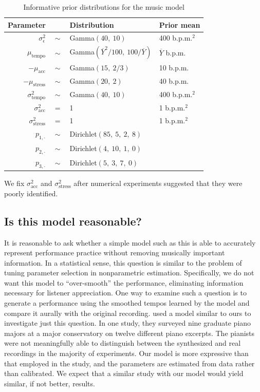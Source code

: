 \documentclass[aoas]{imsart}
\begin{document}
\begin{table}[t]
    \caption{Informative prior distributions for the music model}
  \label{tab:priors}
  \centering
  \begin{tabular}{@{}rcll@{}}
    \toprule
    Parameter & \phantom{a} & Distribution & Prior mean\\
    \midrule
    $\sigma^2_{\epsilon}$ & $\sim$ & Gamma$(40,\ 10)$ & 400 b.p.m.$^2$\\
    $\mu_{\textrm{tempo}}$ & $\sim$ & Gamma$(\overline{Y}^2/100,\ 100
                                      /\overline{Y})$ & $\overline{Y}$
                                                        b.p.m.\\
    $-\mu_{\textrm{acc}} $ & $\sim$ & Gamma$(15,\ 2/3)$ & 10 b.p.m.\\
    $-\mu_{\textrm{stress}} $ & $\sim$ & Gamma$(20,\ 2)$ & 40 b.p.m.\\
    $\sigma^2_{\textrm{tempo}} $ & $\sim$ & Gamma$(40,\ 10)$ & 400
                                                               b.p.m.$^2$\\
    $\sigma^2_{\textrm{acc}} $ & $=$ & 1 & 1 b.p.m.$^2$\\
    $\sigma^2_{\textrm{stress}} $ & $=$ & 1 & 1 b.p.m.$^2$\\
    $p_{1,\cdot}$ & $\sim$ & Dirichlet$(85,\ 5,\ 2,\ 8)$ \\
    $p_{2,\cdot}$ & $\sim$ & Dirichlet$(4,\ 10,\ 1,\ 0)$ \\
    $p_{3,\cdot}$ & $\sim$ & Dirichlet$(5,\ 3,\ 7,\ 0)$ \\
    \bottomrule
  \end{tabular}
\end{table}
We fix $\sigma^2_{\textrm{acc}}$ and $\sigma^2_{\textrm{stress}}$ after numerical experiments suggested
that they were poorly identified.

\subsection{Is this model reasonable?}

It is reasonable to ask whether a simple model such as this is able to
accurately represent performance practice without removing musically important
information. In a statistical sense, this question is similar to the
problem of tuning parameter selection in nonparametric
estimation. Specifically, we do not want this model to
``over-smooth'' the performance, eliminating information necessary for
listener appreciation. One way to examine such a question 
is to generate a performance using the smoothed tempos learned by
the model and compare it aurally with the original recording.
\citet{GuRaphael2012} used a model similar to ours to investigate just
this question. In one study, they surveyed nine graduate piano majors at a
major conservatory on twelve different piano excerpts. The pianists
were not meaningfully able to distinguish between the synthesized and
real recordings in the majority of experiments. Our model is more
expressive than that employed in the study, and the parameters are
estimated from data rather than calibrated. We expect that a similar
study with our model would yield similar, if not better, results.
\end{document}
